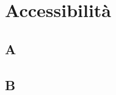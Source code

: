\documentclass[../relazione.tex]{subfiles}
\begin{document}
\section{Accessibilità}
	\subsection{A}
	\subsection{B}
\end{document}
